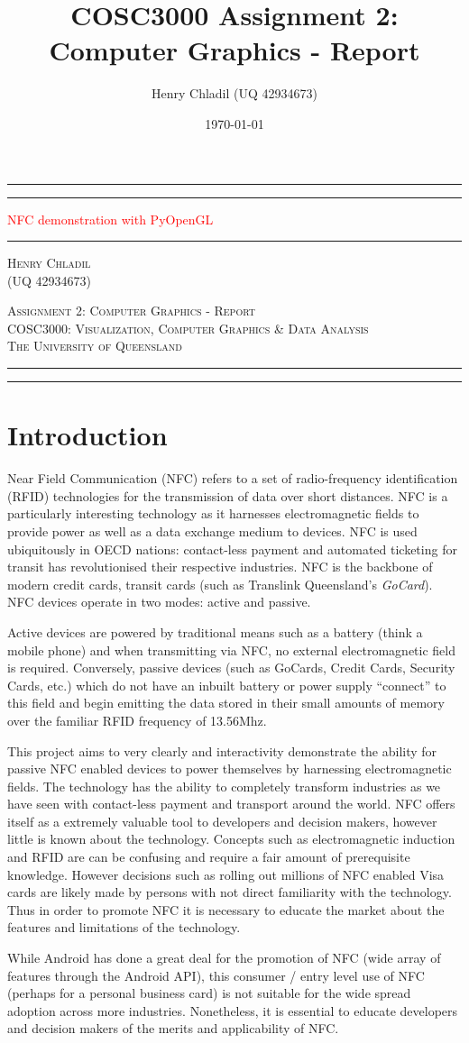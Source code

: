 \documentclass[a4paper]{article}
\title{\vspace{-2cm}COSC3000 Assignment 2: Computer Graphics - Report}
\author{\vspace{-3cm}Henry Chladil (UQ 42934673)}
\date{\today}
\newcommand*{\titleAT}{\begingroup %
\newlength{\drop} %
\drop=0.1\textheight %

\rule{\textwidth}{1pt}\par %
\vspace{2pt}\vspace{-\baselineskip} %
\rule{\textwidth}{0.4pt}\par %

\vspace{\drop} %
\centering %
\textcolor{Red}{ %
{\Huge NFC demonstration with PyOpenGL}\\[0.5\baselineskip] %
} %
\vspace{0.25\drop} %
\rule{0.3\textwidth}{0.4pt}\par %
\vspace{\drop} %

{\Large \textsc{Henry Chladil} \\ \small{(UQ 42934673)}}\par %

\vfill %
{\large \textsc{Assignment 2: Computer Graphics - Report}\\}
{\large \textsc{COSC3000: Visualization, Computer Graphics \& Data Analysis}\\} %
{\large \textsc{The University of Queensland}}\par %

\vspace*{\drop} %

\rule{\textwidth}{0.4pt}\par %
\vspace{2pt}\vspace{-\baselineskip} %
\rule{\textwidth}{1pt}\par %

\endgroup}
\begin{document}
\titleAT %
\clearpage



\section{Introduction}
Near Field Communication (NFC) refers to a set of radio-frequency identification (RFID) technologies for the transmission of data over short distances. NFC is a particularly interesting technology as it harnesses electromagnetic fields to provide power as well as a data exchange medium to devices. NFC is used ubiquitously in OECD nations: contact-less payment and automated ticketing for transit has revolutionised their respective industries. NFC is the backbone of modern credit cards, transit cards (such as Translink Queensland's \emph{GoCard}). NFC devices operate in two modes: active and passive. 

Active devices are powered by traditional means such as a battery (think a mobile phone) and when transmitting via NFC, no external electromagnetic field is required. Conversely, passive devices (such as GoCards, Credit Cards, Security Cards, etc.) which do not have an inbuilt battery or power supply ``connect'' to this field and begin emitting the data stored in their small amounts of memory over the familiar RFID frequency of 13.56Mhz. 

This project aims to very clearly and interactivity demonstrate the ability for passive NFC enabled devices to power themselves by harnessing electromagnetic fields. The technology has the ability to completely transform industries as we have seen with contact-less payment and transport around the world. NFC offers itself as a extremely valuable tool to developers and decision makers, however little is known about the technology. Concepts such as electromagnetic induction and RFID are can be confusing and require a fair amount of prerequisite knowledge. However decisions such as rolling out millions of NFC enabled Visa cards are likely made by persons with not direct familiarity with the technology. Thus in order to promote NFC it is necessary to educate the market about the features and limitations of the technology. 

While Android has done a great deal for the promotion of NFC (wide array of features through the Android API), this consumer / entry level use of NFC (perhaps for a personal business card) is not suitable for the wide spread adoption across more industries. Nonetheless, it is essential to educate developers and decision makers of the merits and applicability of NFC.
\end{document}
